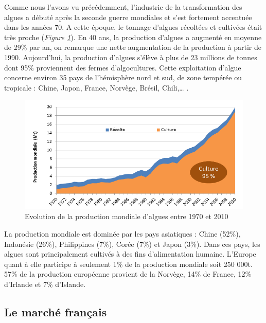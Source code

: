 \documentclass[
]{book}
\begin{document}
Comme nous l'avons vu précédemment, l'industrie de la transformation des algues a débuté après la seconde guerre mondiales et s'est fortement accentuée dans les années 70. A cette époque, le tonnage d'algues récoltées et cultivées était très proche (\emph{Figure \ref{fig:marchemondial}}). En 40 ans, la production d'algues a augmenté en moyenne de 29\% par an, on remarque une nette augmentation de la production à partir de 1990. Aujourd'hui, la production d'algues s'élève à plus de 23 millions de tonnes dont 95\% proviennent des fermes d'algocultures. Cette exploitation d'algue concerne environ 35 pays de l'hémisphère nord et sud, de zone tempérée ou tropicale : Chine, Japon, France, Norvège, Brésil, Chili,\ldots{} .

\begin{figure}

{\centering \includegraphics[width=11.58in]{images/marchemondial} 

}

\caption{Evolution de la production mondiale d’algues entre 1970 et 2010}\label{fig:marchemondial}
\end{figure}

La production mondiale est dominée par les pays asiatiques : Chine (52\%), Indonésie (26\%), Philippines (7\%), Corée (7\%) et Japon (3\%). Dans ces pays, les algues sont principalement cultivés à des fins d'alimentation humaine. L'Europe quant à elle participe à seulement 1\% de la production mondiale soit 250 000t. 57\% de la production européenne provient de la Norvège, 14\% de France, 12\% d'Irlande et 7\% d'Islande.

\hypertarget{le-marchuxe9-franuxe7ais}{%
\subsection{Le marché français}\label{le-marchuxe9-franuxe7ais}}
\end{document}
